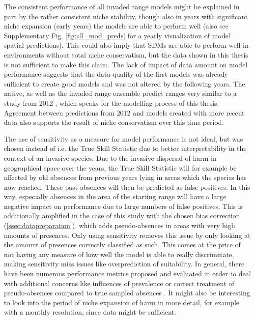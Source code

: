 \documentclass[12pt,a4paper]{article}
\begin{document}
The consistent performance of all invaded range models might be explained in part by the rather consistent niche stability, though also in years with significant niche expansion (early years) the models are able to perform well (also see Supplementary Fig. \ref{fig:all_mod_preds} for a yearly visualization of model spatial predictions).
This could also imply that SDMs are able to perform well in environments without total niche conservatism, but the data shown in this thesis is not sufficient to make this claim.
The lack of impact of data amount on model performance suggests that the data quality of the first models was already sufficient to create good models and was not altered by the following years.
The native, as well as the invaded range ensemble predict ranges very similar to a study from 2012 \autocite{bidinger2012harmSDMglobalMaxent}, which speaks for the modelling process of this thesis.
Agreement between predictions from 2012 and models created with more recent data also supports the result of niche conservatism over this time period.

The use of sensitivity as a measure for model performance is not ideal, but was chosen instead of i.e. the True Skill Statistic due to better interpretability in the context of an invasive species.
Due to the invasive dispersal of \gls{harm} in geographical space over the years, the True Skill Statistic will for example be affected by old absences from previous years lying in areas which the species has now reached. These past absences will then be predicted as false positives.
In this way, especially absences in the area of the starting range will have a large negative impact on performance due to large numbers of false positives.
This is additionally amplified in the case of this study with the chosen bias correction (\autoref{ssec:datapreparation}), which adds pseudo-absences in areas with very high amounts of presences.
Only using sensitivity removes this issue by only looking at the amount of presences correctly classified as such.
This comes at the price of not having any measure of how well the model is able to really discriminate, making sensitivity miss issues like overprediction of suitability.
In general, there have been numerous performance metrics proposed and evaluated in order to deal with additional concerns like influences of prevalence or correct treatment of pseudo-absences compared to true sampled absences \autocite{leroy2018TSSissues, konowalik2021SDMmetrics}.
It might also be interesting to look into the period of niche expansion of \gls{harm} in more detail, for example with a monthly resolution, since data might be sufficient.
\end{document}
